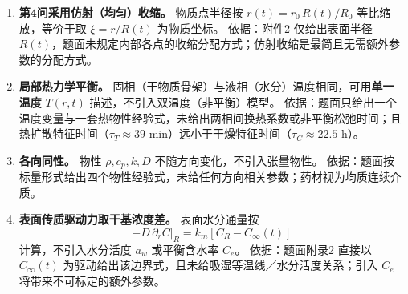 \begin{enumerate}[label=\textbf{假设\arabic*.},leftmargin=2.4em]
\item \textbf{第4问采用仿射（均匀）收缩。}
物质点半径按 $r(t)=r_0\,R(t)/R_0$ 等比缩放，等价于取 $\xi=r/R(t)$ 为物质坐标。
依据：附件2 仅给出表面半径 $R(t)$，题面未规定内部各点的收缩分配方式；仿射收缩是最简且无需额外参数的分配方式。

\item \textbf{局部热力学平衡。}
固相（干物质骨架）与液相（水分）温度相同，可用\textbf{单一温度} $T(r,t)$ 描述，不引入双温度（非平衡）模型。
依据：题面只给出一个温度变量与一套热物性经验式，未给出两相间换热系数或非平衡松弛时间；且热扩散特征时间（$\tau_T\approx39$ min）远小于干燥特征时间（$\tau_C\approx22.5$ h）。

\item \textbf{各向同性。}
物性 $\rho,c_p,k,D$ 不随方向变化，不引入张量物性。
依据：题面按标量形式给出四个物性经验式，未给任何方向相关参数；药材视为均质连续介质。

\item \textbf{表面传质驱动力取干基浓度差。}
表面水分通量按
\begin{equation}
-D\,\partial_rC\big|_{R}=k_m\left[C_R-C_\infty(t)\right]
\end{equation}
计算，不引入水分活度 $a_w$ 或平衡含水率 $C_e$。
依据：题面附录2 直接以 $C_\infty(t)$ 为驱动给出该边界式，且未给吸湿等温线／水分活度关系；引入 $C_e$ 将带来不可标定的额外参数。

\end{enumerate}
